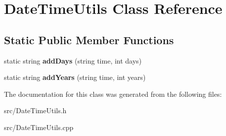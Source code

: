 \hypertarget{class_date_time_utils}{}\section{Date\+Time\+Utils Class Reference}
\label{class_date_time_utils}
\subsection*{Static Public Member Functions}
\begin{DoxyCompactItemize}
\item 
\mbox{\label{class_date_time_utils_a0116f7ee9d799e4a4a52975c79600a65}} 
static string {\bfseries add\+Days} (string time, int days)
\item 
\mbox{\label{class_date_time_utils_aee21079e4db5bca85131a7c70c5475e1}} 
static string {\bfseries add\+Years} (string time, int years)
\end{DoxyCompactItemize}


The documentation for this class was generated from the following files\+:\begin{DoxyCompactItemize}
\item 
src/Date\+Time\+Utils.\+h\item 
src/Date\+Time\+Utils.\+cpp\end{DoxyCompactItemize}

